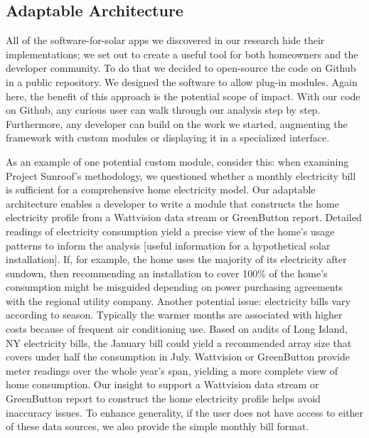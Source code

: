 \documentclass[pageno]{jpaper}
\begin{document}
\subsection{Adaptable Architecture}
All of the software-for-solar apps we discovered in our research hide their implementations; we set out to create a useful tool for both homeowners and the developer community. To do that we decided to open-source the code on Github in a public repository. We designed the software to allow plug-in modules. Again here, the benefit of this approach is the potential scope of impact. With our code on Github, any curious user can walk through our analysis step by step. Furthermore, any developer can build on the work we started, augmenting the framework with custom modules or displaying it in a specialized interface.

As an example of one potential custom module, consider this: when examining Project Sunroof's methodology, we questioned whether a monthly electricity bill is sufficient for a comprehensive home electricity model. Our adaptable architecture enables a developer to write a module that constructs the home electricity profile from a Wattvision data stream or GreenButton report. Detailed readings of electricity consumption yield a precise view of the home's usage patterns to inform the analysis [useful information for a hypothetical solar installation]. If, for example, the home uses the majority of its electricity after sundown, then recommending an installation to cover 100\% of the home's consumption might be misguided depending on power purchasing agreements with the regional utility company. Another potential issue: electricity bills vary according to season. Typically the warmer months are associated with higher costs because of frequent air conditioning use. Based on audits of Long Island, NY electricity bills, the January bill could yield a recommended array size that covers under half the consumption in July. Wattvision or GreenButton provide meter readings over the whole year's span, yielding a more complete view of home consumption. Our insight to support a Wattvision data stream or GreenButton report to construct the home electricity profile helps avoid inaccuracy issues. To enhance generality, if the user does not have access to either of these data sources, we also provide the simple monthly bill format.
\end{document}
